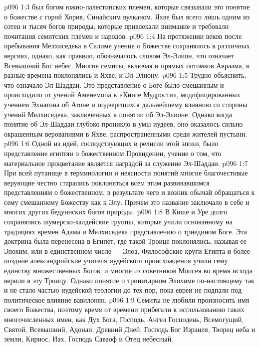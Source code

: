 \vs p096 1:3 \bibnobreakspace {} был богом южно\hyp{}палестинских племен, которые связывали это понятие о божестве с горой Хорив, Синайским вулканом. Яхве был всего лишь одним из сотен и тысяч богов природы, которые привлекали внимание и требовали почитания семитских племен и народов.
\vs p096 1:4 \pc {}\bibnobreakspace {} На протяжении веков после пребывания Мелхиседека в Салиме  учение о Божестве сохранялось в различных версиях, однако, как правило, обозначалось словом Эл\hyp{}Элион, что означает Всевышний Бог небес. Многие семиты, включая и прямых потомков Авраама, в разные времена поклонялись и Яхве, и Эл\hyp{}Элиону.
\vs p096 1:5 \pc {}\bibnobreakspace {} Трудно объяснить, что означало Эл\hyp{}Шаддаи. Это представление о Боге было смешанным и происходило от учений Аменемопа в «Книге Мудрости», модифицированных учением Эхнатона об Атоне и подвергшихся дальнейшему влиянию со стороны учений Мелхиседека, заключенных в понятии об Эл\hyp{}Элионе. Однако когда понятие об Эл\hyp{}Шаддаи глубоко проникло в умы иудеев, оно оказалось сильно окрашенным верованиями в Яхве, распространенными среди жителей пустыни.
\vs p096 1:6 Одной из идей, господствующих в религии этой эпохи, было представление египтян о божественном Провидении, учение о том, что материальное процветание является наградой за служение Эл\hyp{}Шаддаи.
\vs p096 1:7 \pc {}\bibnobreakspace {} При всей путанице в терминологии и неясности понятий многие благочестивые верующие честно старались поклоняться всем этим развивавшимся представлениям о божественном, в результате чего и возник обычай обращаться к сему смешанному Божеству как к Элу. Причем это название заключало в себе и многих других бедуинских богов природы.
\vs p096 1:8 \pc {}\bibnobreakspace {} В Кише и Уре долго сохранялись шумерско\hyp{}халдейские группы, которые учили основанному на традициях времен Адама и Мелхиседека представлению о триедином Боге. Эта доктрина была перенесена в Египет, где такой Троице поклонялись, называя ее Элохим, или в единственном числе --- Элоа. Философские круги Египта и более поздние александрийские учителя иудейского происхождения учили сему единству множественных Богов, и многие из советников Моисея во время исхода верили в эту Троицу. Однако понятие о тринитарном Элохиме по\hyp{}настоящему так и не стало частью иудейской теологии до тех пор, пока евреи не подпали под политическое влияние вавилонян.
\vs p096 1:9 \pc {}\bibnobreakspace {} Семиты не любили произносить имя своего Божества, поэтому время от времени прибегали к использованию таких многочисленных имен, как Дух Бога, Господь, Ангел Господень, Всемогущий, Святой, Всевышний, Адонаи, Древний Дней, Господь Бог Израиля, Творец неба и земли, Кириос, Иах, Господь Саваоф и Отец небесный.
